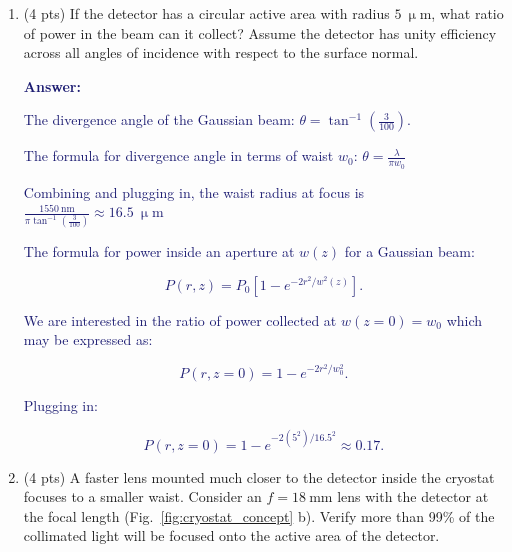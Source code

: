 \documentclass[11pt]{caltech_thesis} %
\begin{document}
\begin{enumerate}
\def\labelenumi{\arabic{enumi}.}
\item
  (4 pts)
  If the detector has a circular active area with radius $5~\mathrm{\upmu m}$, what ratio of power in the beam can it collect? Assume the detector has unity efficiency across all angles of incidence with respect to the surface normal.

  \textcolor{midnightblue}{

  \textbf{Answer:}

  }

  \textcolor{midnightblue}{

  The divergence angle of the Gaussian beam: $\theta = \tan^{-1}({\frac{3}{100}})$.

  }

  \textcolor{midnightblue}{ The formula for divergence angle in terms of waist $w_0$: $\theta = \frac{\lambda}{\pi w_0}$ }

  \textcolor{midnightblue}{ Combining and plugging in, the waist radius at focus is $\frac{1550~\mathrm{nm}}{\pi \tan^{-1}(\frac{3}{100})} \approx 16.5~ \mathrm{\upmu m}$ }

  \textcolor{midnightblue}{ The formula for power inside an aperture at $w(z)$ for a Gaussian beam:}

  \textcolor{midnightblue}{

  $$P(r, z)=P_{0}\left[1-e^{-2 r^{2} / w^{2}(z)}\right].$$

  }

  \textcolor{midnightblue}{We are interested in the ratio of power collected at $w(z=0) = w_0$ which may be expressed as:}

  \textcolor{midnightblue}{

  $$P(r, z=0)=1-e^{-2 r^{2} / w_0^{2}}.$$

  }

  \textcolor{midnightblue}{Plugging in: }

  \textcolor{midnightblue}{

  $$P(r, z=0)=1-e^{-2(5^{2}) / 16.5^{2}} \approx  \boxed{0.17}. $$

  }
\item
  (4 pts)
  A faster lens mounted much closer to the detector inside the cryostat focuses to a smaller waist. Consider an $f = 18~\mathrm{mm}$ lens with the detector at the focal length (Fig.~\ref{fig:cryostat_concept} b). Verify more than 99\% of the collimated light will be focused onto the active area of the detector.


\end{enumerate}
\end{document}
